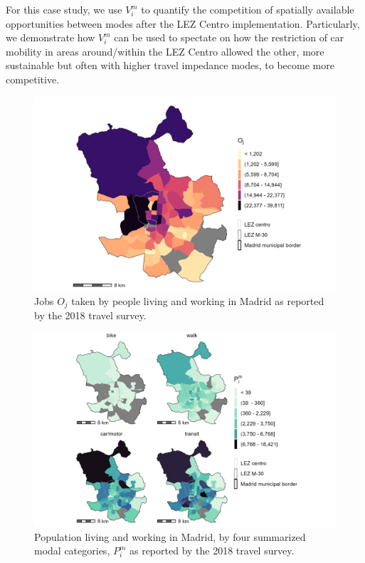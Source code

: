 \documentclass[10pt,letterpaper]{article}
\begin{document}
For this case study, we use \(V_i^m\) to quantify the competition of
spatially available opportunities between modes after the LEZ Centro
implementation. Particularly, we demonstrate how \(V_i^m\) can be used
to spectate on how the restriction of car mobility in areas
around/within the LEZ Centro allowed the other, more sustainable but
often with higher travel impedance modes, to become more competitive.

\begin{figure}

{\centering \includegraphics[width=1\linewidth]{images/i_jobs_zn208_plot} 

}

\caption{\label{fig:Fig2} Jobs $O_j$ taken by people living and working in Madrid as reported by the 2018 travel survey.}\label{fig:jobs-plot}
\end{figure}

\begin{figure}

{\centering \includegraphics[width=1\linewidth]{images/im_populations_zn208_plot} 

}

\caption{\label{fig:Fig3} Population living and working in Madrid, by four summarized modal categories, $P^m_i$ as reported by the 2018 travel survey.}\label{fig:pop-plot}
\end{figure}
\end{document}

